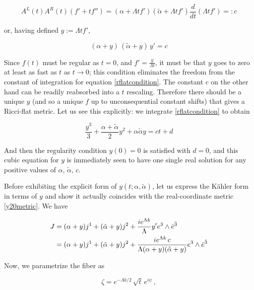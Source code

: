 \begin{equation}
	A^L(t)A^R(t)(f'+tf'') = (\alpha + \Lambda t f')(\tilde{\alpha} + \Lambda t f') \frac{d}{dt} (\Lambda t f') =: c \label{rflatcondition}
\end{equation}

or, having defined $y := \Lambda t f'$,

\begin{equation}
	(\alpha + y)\,(\tilde{\alpha} + y)\, y' = c
\end{equation}

Since $f(t)$ must be regular as $t=0$, and $f' = \frac{y}{\Lambda t}$, it must be that $y$ goes to zero at least as fast as $t$ as $t\rightarrow 0$; this condition eliminates the freedom from the constant of integration for equation \ref{rflatcondition}. The constant $c$ on the other hand can be readily reabsorbed into a $t$ rescaling. Therefore there should be a unique $y$ (and so a unique $f$ up to unconsequential constant shifts) that gives a Ricci-flat metric. Let us see this explicitly: we integrate \ref{rflatcondition} to obtain

\begin{equation}
	\frac{y^3}{3} + \frac{\alpha + \tilde{\alpha}}{2} y^2 + \alpha \tilde{\alpha} y = ct + d \label{rflatintegrated}
\end{equation}

And then the regularity condition $y(0)=0$ is satisfied with $d=0$, and this cubic equation for $y$ is immediately seen to have one single real solution for any positive values of $\alpha$, $\tilde\alpha$, $c$.

Before exhibiting the explicit form of $y(t;\alpha,\tilde\alpha)$, let us express the K\"ahler form in terms of $y$ and show it actually coincides with the real-coordinate metric \ref{y20metric}. We have

\begin{align}
	\label{Jintermsofy}
	J & =  (\alpha + y) j^1 + (\tilde{\alpha} + y) j^2 + \frac{ie^{\Lambda k}}\Lambda y' e^3 \wedge \bar e^{\bar 3}\\
	  & =  (\alpha + y) j^1 + (\tilde{\alpha} + y) j^2 + \frac{ie^{\Lambda k} \,c}{\Lambda (\alpha + y)(\tilde{\alpha} + y)} e^3 \wedge \bar e^{\bar 3}
\end{align}

Now, we parametrize the fiber as 

\begin{equation}
	\zeta = e^{-\Lambda k/2}\, \sqrt{t} \,e^{i\psi}\,,
\end{equation}

